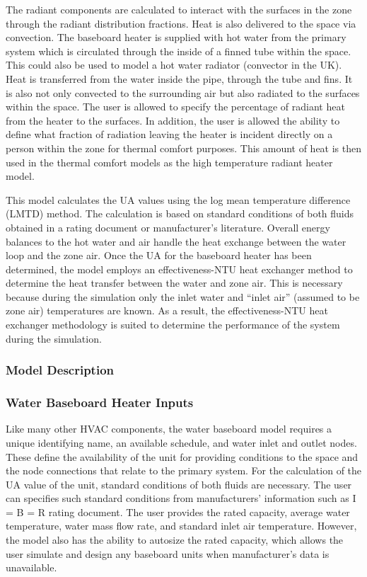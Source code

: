 The radiant components are calculated to interact with the surfaces in the zone through the radiant distribution fractions. Heat is also delivered to the space via convection. The baseboard heater is supplied with hot water from the primary system which is circulated through the inside of a finned tube within the space. This could also be used to model a hot water radiator (convector in the UK). Heat is transferred from the water inside the pipe, through the tube and fins. It is also not only convected to the surrounding air but also radiated to the surfaces within the space. The user is allowed to specify the percentage of radiant heat from the heater to the surfaces. In addition, the user is allowed the ability to define what fraction of radiation leaving the heater is incident directly on a person within the zone for thermal comfort purposes. This amount of heat is then used in the thermal comfort models as the high temperature radiant heater model.

This model calculates the UA values using the log mean temperature difference (LMTD) method. The calculation is based on standard conditions of both fluids obtained in a rating document or manufacturer's literature. Overall energy balances to the hot water and air handle the heat exchange between the water loop and the zone air. Once the UA for the baseboard heater has been determined, the model employs an effectiveness-NTU heat exchanger method to determine the heat transfer between the water and zone air. This is necessary because during the simulation only the inlet water and ``inlet air'' (assumed to be zone air) temperatures are known. As a result, the effectiveness-NTU heat exchanger methodology is suited to determine the performance of the system during the simulation.

\subsubsection{Model Description}\label{model-description-2-002}

\subsubsection{Water Baseboard Heater Inputs}\label{water-baseboard-heater-inputs}

Like many other HVAC components, the water baseboard model requires a unique identifying name, an available schedule, and water inlet and outlet nodes. These define the availability of the unit for providing conditions to the space and the node connections that relate to the primary system. For the calculation of the UA value of the unit, standard conditions of both fluids are necessary. The user can specifies such standard conditions from manufacturers' information such as I = B = R rating document. The user provides the rated capacity, average water temperature, water mass flow rate, and standard inlet air temperature. However, the model also has the ability to autosize the rated capacity, which allows the user simulate and design any baseboard units when manufacturer's data is unavailable.

